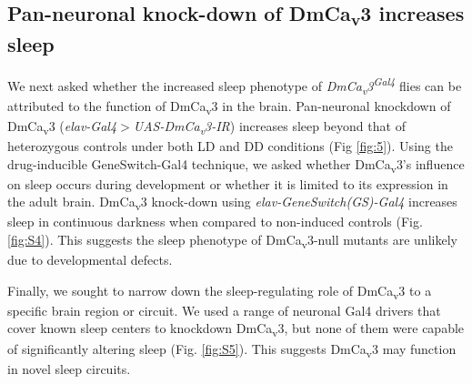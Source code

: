 \subsection*{Pan-neuronal knock-down of DmCa\textsubscript{v}3 increases sleep}

We next asked whether the increased sleep phenotype of \emph{DmCa\textsubscript{v}3\textsuperscript{Gal4}} flies can be attributed to the function of DmCa\textsubscript{v}3 in the brain.
Pan-neuronal knockdown of DmCa\textsubscript{v}3 (\emph{elav-Gal4$>$UAS-DmCa\textsubscript{v}3-IR}) increases sleep beyond that of heterozygous controls under both LD and DD conditions (Fig \ref{fig:5}).
Using the drug-inducible GeneSwitch-Gal4 technique\cite{Osterwalder:2001cl}, we asked whether DmCa\textsubscript{v}3's influence on sleep occurs during development or whether it is limited to its expression in the adult brain.
DmCa\textsubscript{v}3 knock-down using \emph{elav-GeneSwitch(GS)-Gal4} increases sleep in continuous darkness when compared to non-induced controls (Fig.\ref{fig:S4}).
This suggests the sleep phenotype of DmCa\textsubscript{v}3-null mutants are unlikely due to developmental defects.

Finally, we sought to narrow down the sleep-regulating role of DmCa\textsubscript{v}3 to a specific brain region or circuit.
We used a range of neuronal Gal4 drivers that cover known sleep centers to knockdown DmCa\textsubscript{v}3, but none of them were capable of significantly altering sleep (Fig. \ref{fig:S5}).
This suggests DmCa\textsubscript{v}3 may function in novel sleep circuits.
  
  